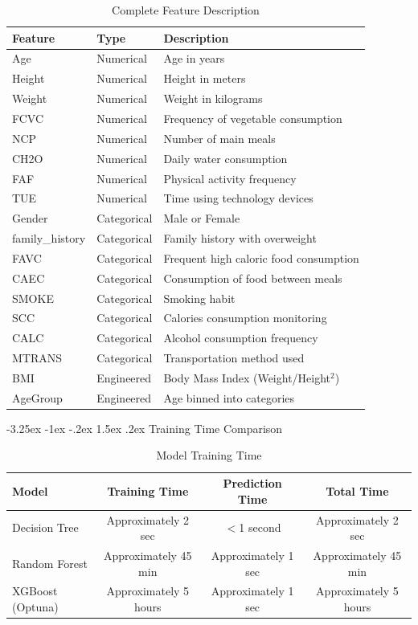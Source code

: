 \documentclass[12pt,a4paper]{article}
\makeatletter
\renewcommand{\subsection}{\@startsection{subsection}{2}{\z@}%
                                   {-3.25ex \@plus -1ex \@minus -.2ex}%
                                   {1.5ex \@plus .2ex}%
                                   {\normalfont\large\bfseries\vspace{0.3\baselineskip}}}
\makeatother
\begin{document}
\begin{table}[H]
\centering
\caption{Complete Feature Description}
\begin{tabular}{lll}
\toprule
\textbf{Feature} & \textbf{Type} & \textbf{Description} \\
\midrule
Age & Numerical & Age in years \\
Height & Numerical & Height in meters \\
Weight & Numerical & Weight in kilograms \\
FCVC & Numerical & Frequency of vegetable consumption \\
NCP & Numerical & Number of main meals \\
CH2O & Numerical & Daily water consumption \\
FAF & Numerical & Physical activity frequency \\
TUE & Numerical & Time using technology devices \\
Gender & Categorical & Male or Female \\
family\_history & Categorical & Family history with overweight \\
FAVC & Categorical & Frequent high caloric food consumption \\
CAEC & Categorical & Consumption of food between meals \\
SMOKE & Categorical & Smoking habit \\
SCC & Categorical & Calories consumption monitoring \\
CALC & Categorical & Alcohol consumption frequency \\
MTRANS & Categorical & Transportation method used \\
\midrule
BMI & Engineered & Body Mass Index (Weight/Height$^2$) \\
AgeGroup & Engineered & Age binned into categories \\
\bottomrule
\end{tabular}
\end{table}

\subsection{Training Time Comparison}

\begin{table}[H]
\centering
\caption{Model Training Time}
\begin{tabular}{lccc}
\toprule
\textbf{Model} & \textbf{Training Time} & \textbf{Prediction Time} & \textbf{Total Time} \\
\midrule
Decision Tree & Approximately 2 sec & $<$1 second & Approximately 2 sec \\
Random Forest & Approximately 45 min & Approximately 1 sec & Approximately 45 min \\
XGBoost (Optuna) & Approximately 5 hours & Approximately 1 sec & Approximately 5 hours \\
\bottomrule
\end{tabular}
\end{table}
\end{document}
